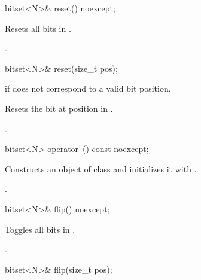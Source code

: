 \begin{itemdecl}
bitset<N>& reset() noexcept;
\end{itemdecl}

\begin{itemdescr}
\pnum
\effects
Resets all bits in
.

\pnum
\returns
{}.
\end{itemdescr}

\begin{itemdecl}
bitset<N>& reset(size_t pos);
\end{itemdecl}

\begin{itemdescr}
\pnum
\throws
{}
if  does not correspond to a valid bit position.
%

\pnum
\effects
Resets the bit at position  in
.

\pnum
\returns
{}.
\end{itemdescr}

%
\begin{itemdecl}
bitset<N> operator~() const noexcept;
\end{itemdecl}

\begin{itemdescr}
\pnum
\effects
Constructs an object  of class
and initializes it with
.

\pnum
\returns
{}.
\end{itemdescr}

%
\begin{itemdecl}
bitset<N>& flip() noexcept;
\end{itemdecl}

\begin{itemdescr}
\pnum
\effects
Toggles all bits in
.

\pnum
\returns
{}.
\end{itemdescr}

\begin{itemdecl}
bitset<N>& flip(size_t pos);
\end{itemdecl}

